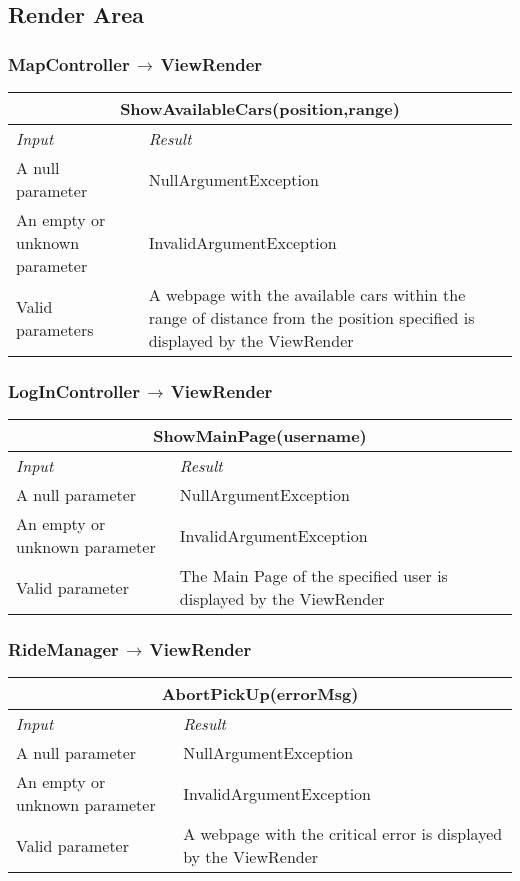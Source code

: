 \documentclass[11pt,a4paper]{report}
\begin{document}
\subsection{Render Area}
\subsubsection{MapController$\,\to\,$ViewRender}
\begin{tabularx}{\textwidth}{|X|X|}
	\hline
	\multicolumn{2}{|c|}{\textbf{ShowAvailableCars(position,range)}}\\
	\hline
	\textit{Input} & \textit{Result}\\
	\hline
	A null parameter & NullArgumentException\\
	\hline
	An empty or unknown parameter & InvalidArgumentException\\
	\hline
	Valid parameters & A webpage with the available cars within the range of distance from the position specified is displayed by the ViewRender\\
	\hline
\end{tabularx}
\subsubsection{LogInController$\,\to\,$ViewRender}
\begin{tabularx}{\textwidth}{|X|X|}
	\hline
	\multicolumn{2}{|c|}{\textbf{ShowMainPage(username)}}\\
	\hline
	\textit{Input} & \textit{Result}\\
	\hline
	A null parameter & NullArgumentException\\
	\hline
	An empty or unknown parameter & InvalidArgumentException\\
	\hline
	Valid parameter & The Main Page of the specified user is displayed by the ViewRender\\
	\hline
\end{tabularx}
\subsubsection{RideManager$\,\to\,$ViewRender}
\begin{tabularx}{\textwidth}{|X|X|}
	\hline
	\multicolumn{2}{|c|}{\textbf{AbortPickUp(errorMsg)}}\\
	\hline
	\textit{Input} & \textit{Result}\\
	\hline
	A null parameter & NullArgumentException\\
	\hline
	An empty or unknown parameter & InvalidArgumentException\\
	\hline
	Valid parameter & A webpage with the critical error is displayed by the ViewRender\\
	\hline
\end{tabularx}
\end{document}
